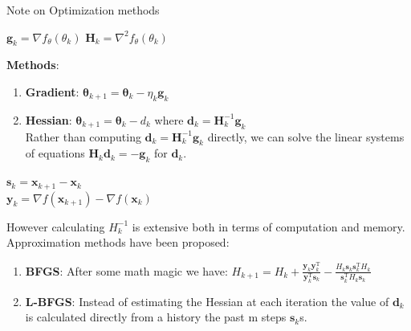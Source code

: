 \documentclass{beamer}
\begin{document}
\begin{frame}[allowframebreaks]{Note on Optimization methods}

    \begin{center}
        $\mathbf{g}_k = \nabla f_{\theta}(\theta_k) $ \hspace{10mm}
        $\mathbf{H}_k = \nabla^{2} f_{\theta}(\theta_k)$
    \end{center}
    \textbf{Methods}:
    \begin{enumerate}
        \item \textbf{Gradient}: $\boldsymbol{\theta}_{k+1} =
            \boldsymbol{\theta}_k - \eta_k \mathbf{g}_k$
        \item \textbf{Hessian}: $\boldsymbol{\theta}_{k+1} = \boldsymbol{\theta}_k - d_k$
            where $\mathbf{d}_k = \mathbf{H}_k^{-1} \mathbf{g}_k$ \\
            Rather than computing $\mathbf{d}_k = \mathbf{H}_k^{-1} \mathbf{g}_k$ directly,
            we can solve the linear systems of equations
            $\mathbf{H}_k \mathbf{d}_k = -\mathbf{g}_k$ for $\mathbf{d}_k$.
    \end{enumerate}

    \newpage

    \begin{center}
        $\mathbf{s}_k = \mathbf {x} _{k+1}-\mathbf {x} _{k}$\\
        $\mathbf{y}_k = \nabla f(\mathbf {x} _{k+1})-
                    \nabla f(\mathbf {x} _{k})$
    \end{center}
    However calculating $H^{-1}_k$ is extensive both in terms of computation
    and memory. Approximation methods have been proposed:
    \begin{enumerate}
        \item \textbf{BFGS}: After some math magic we have:
            $H_{k+1}=H_{k}+{\frac {\mathbf {y} _{k}\mathbf {y} _{k}^{\mathrm {T} }}{\mathbf {y} _{k}^{\mathrm {T} }\mathbf {s} _{k}}}-{\frac {H_{k}\mathbf {s} _{k}\mathbf {s} _{k}^{\mathrm {T} }H_{k}}{\mathbf {s} _{k}^{\mathrm {T} }H_{k}\mathbf {s} _{k}}}$
        \item \textbf{L-BFGS}: Instead of estimating the Hessian at each
            iteration the value of $\mathbf{d}_k$ is calculated directly from
            a history the past m steps $\mathbf{s}_k$s.
    \end{enumerate}

    \begin{table}[]
        \centering
        \caption*{Minimizing $\mathcal{L}_{total}$ With Different Optimizers}
        \label{my-label}
    \end{table}
\end{frame}
\end{document}

